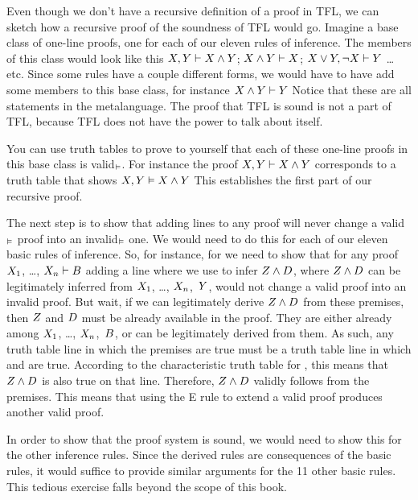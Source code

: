 Even though we don't have a recursive definition of a proof in TFL, we can sketch how a recursive proof of the soundness of TFL would go. Imagine a base class of one-line proofs, one for each of our eleven rules of inference. The members of this class would look like this $X, Y \vdash  X \wedge Y$; $X \wedge Y \vdash X$; $X \vee Y, \neg X \vdash  Y$ \ldots{} etc. Since some rules have a couple different forms, we would have to have add some members to this base class, for instance $X \wedge Y \vdash  Y$ Notice that these are all statements in the metalanguage. The proof that TFL is sound is not a part of TFL, because TFL does not have the power to talk about itself. 

You can use truth tables to prove to yourself that each of these one-line proofs in this base class is valid$_{\vDash}$. For instance the proof $X, Y \vdash X \wedge Y$ corresponds to a truth table that shows $X, Y \vDash  X \wedge Y$ This establishes the first part of our recursive proof. 

The next step is to show that adding lines to any proof will never change a valid$_{\vDash}$ proof into an invalid$_{\vDash}$ one. We would need to do this for each of our eleven basic rules of inference. So, for instance, for  we need to show that for any proof $X_{1}$, \dots, $X_{n} \vdash  B$ adding a line where we use  to infer $Z \wedge D$, where $Z \wedge D$ can be legitimately inferred from $X_{1}$, \dots, $X_{n}$,~$Y$, would not change a valid proof into an invalid proof. But wait, if we can legitimately derive $Z \wedge D$ from these premises, then $Z$ and $D$ must be already available in the proof. They are either already among $X_{1}$, \dots, $X_{n}$,~$B$, or can be legitimately derived from them. As such, any truth table line in which the premises are true must be a truth table line in which \metaZ and  are true. According to the characteristic truth table for \eand, this means that $Z \wedge D$ is also true on that line. Therefore, $Z \wedge D$ validly follows from the premises. This means that using the {\eand}E rule to extend a valid proof produces another valid proof.

In order to show that the proof system is sound, we would need to show this for the other inference rules. Since the derived rules are consequences of the basic rules, it would suffice to provide similar arguments for the 11 other basic rules. This tedious exercise falls beyond the scope of this book.

